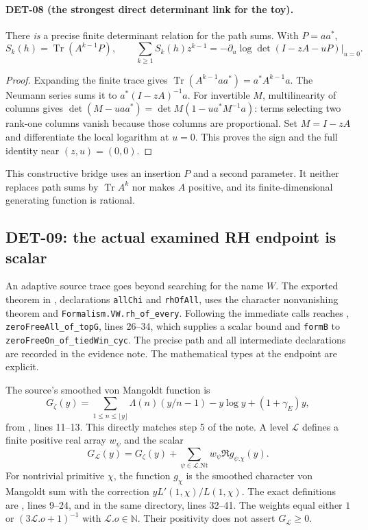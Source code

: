 \documentclass[11pt,a4paper]{article}
\newcommand{\Tr}{\operatorname{Tr}}
\begin{document}
\paragraph{DET-08 (the strongest direct determinant link for the toy).}
There \emph{is} a precise finite determinant relation for the path sums. With $P=aa^*$,
\[
 S_k(h)=\Tr(A^{k-1}P),\qquad
 \sum_{k\ge1}S_k(h)z^{k-1}
 =-\left.\partial_u\log\det(I-zA-uP)\right|_{u=0}.
\]
\begin{proof}
Expanding the finite trace gives $\Tr(A^{k-1}aa^*)=a^*A^{k-1}a$. The Neumann series sums it to $a^*(I-zA)^{-1}a$. For invertible $M$, multilinearity of columns gives
$\det(M-uaa^*)=\det M(1-u a^*M^{-1}a)$: terms selecting two rank-one columns vanish because those columns are proportional. Set $M=I-zA$ and differentiate the local logarithm at $u=0$. This proves the sign and the full identity near $(z,u)=(0,0)$.
\end{proof}
This constructive bridge uses an insertion $P$ and a second parameter. It neither replaces path sums by $\Tr A^k$ nor makes $A$ positive, and its finite-dimensional generating function is rational.

\subsection{DET-09: the actual examined RH endpoint is scalar}
An adaptive source trace goes beyond searching for the name $W$. The exported theorem in , declarations \texttt{allChi} and \texttt{rhOfAll}, uses the character nonvanishing theorem and \texttt{Formalism.VW.rh\_of\_every}. Following the immediate calls reaches , \texttt{zeroFreeAll\_of\_topG}, lines 26--34, which supplies a scalar bound and \texttt{formB} to \texttt{zeroFreeOn\_of\_tiedWin\_cyc}. The precise path and all intermediate declarations are recorded in the evidence note. The mathematical types at the endpoint are explicit.

The source's smoothed von Mangoldt function is
\[
 G_\zeta(y)=\sum_{1\le n\le\lfloor y\rfloor}\Lambda(n)(y/n-1)
 -y\log y+(1+\gamma_E)y,
\]
from , lines 11--13. This directly matches step 5 of the note. A level $\mathcal L$ defines a finite positive real array $w_\psi$ and the scalar
\[
 G_{\mathcal L}(y)=G_\zeta(y)+\sum_{\psi\in\mathcal L.\mathrm{Nt}}w_\psi\Re g_{\psi.\chi}(y).
\]
For nontrivial primitive $\chi$, the function $g_\chi$ is the smoothed character von Mangoldt sum with the correction $yL'(1,\chi)/L(1,\chi)$. The exact definitions are , lines 9--24, and  in the same directory, lines 32--41. The weights equal either $1$ or $(3\mathcal L.o+1)^{-1}$ with $\mathcal L.o\in\mathbb N$. Their positivity does not assert $G_{\mathcal L}\ge0$.
\end{document}
